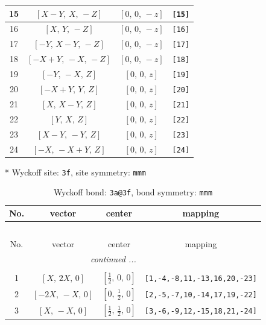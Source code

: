 \documentclass[fleqn,8pt]{jsarticle}
\begin{document}
\begin{longtable}{cccc}
15 & $\left[ X - Y,\, X,\, - Z \right]$ & $\left[ 0,\, 0,\, - z \right]$ & {\tt [15]} \\ \hline
16 & $\left[ X,\, Y,\, - Z \right]$ & $\left[ 0,\, 0,\, - z \right]$ & {\tt [16]} \\ \hline
17 & $\left[ - Y,\, X - Y,\, - Z \right]$ & $\left[ 0,\, 0,\, - z \right]$ & {\tt [17]} \\ \hline
18 & $\left[ - X + Y,\, - X,\, - Z \right]$ & $\left[ 0,\, 0,\, - z \right]$ & {\tt [18]} \\ \hline
19 & $\left[ - Y,\, - X,\, Z \right]$ & $\left[ 0,\, 0,\, z \right]$ & {\tt [19]} \\ \hline
20 & $\left[ - X + Y,\, Y,\, Z \right]$ & $\left[ 0,\, 0,\, z \right]$ & {\tt [20]} \\ \hline
21 & $\left[ X,\, X - Y,\, Z \right]$ & $\left[ 0,\, 0,\, z \right]$ & {\tt [21]} \\ \hline
22 & $\left[ Y,\, X,\, Z \right]$ & $\left[ 0,\, 0,\, z \right]$ & {\tt [22]} \\ \hline
23 & $\left[ X - Y,\, - Y,\, Z \right]$ & $\left[ 0,\, 0,\, z \right]$ & {\tt [23]} \\ \hline
24 & $\left[ - X,\, - X + Y,\, Z \right]$ & $\left[ 0,\, 0,\, z \right]$ & {\tt [24]} \\
\end{longtable}
* Wyckoff site: {\tt 3f}, site symmetry: {\tt mmm}
\renewcommand{\arraystretch}{1.2}
\begin{longtable}{cccc}
\caption{Wyckoff bond: {\tt 3a@3f}, bond symmetry: {\tt mmm}}
 \\
 \hline \hline
No. & vector & center & mapping \\ \hline \endfirsthead

\multicolumn{3}{l}{\tablename\ \thetable{}} \\
 \hline \hline
No. & vector & center & mapping \\ \hline \endhead

 \hline \hline
\multicolumn{3}{r}{\footnotesize\it continued ...} \\ \endfoot

 \hline \hline
\multicolumn{3}{r}{} \\ \endlastfoot

1 & $\left[ X,\, 2 X,\, 0 \right]$ & $\left[ \frac{1}{2},\, 0,\, 0 \right]$ & {\tt [1,-4,-8,11,-13,16,20,-23]} \\ \hline
2 & $\left[ - 2 X,\, - X,\, 0 \right]$ & $\left[ 0,\, \frac{1}{2},\, 0 \right]$ & {\tt [2,-5,-7,10,-14,17,19,-22]} \\ \hline
3 & $\left[ X,\, - X,\, 0 \right]$ & $\left[ \frac{1}{2},\, \frac{1}{2},\, 0 \right]$ & {\tt [3,-6,-9,12,-15,18,21,-24]} \\
\end{longtable}
\end{document}

